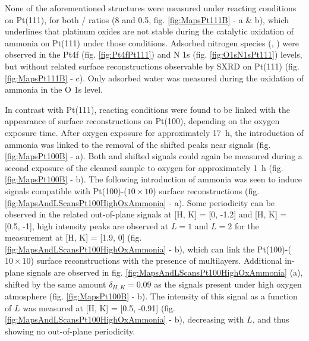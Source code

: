 None of the aforementioned structures were measured under reacting conditions on Pt(111), for both / ratios (\num{8} and \num{0.5}, fig. \ref{fig:MapsPt111B} - a \& b), which underlines that platinum oxides are not stable during the catalytic oxidation of ammonia on Pt(111) under those conditions.
Adsorbed nitrogen species (, ) were observed in the Pt4f (fig. \ref{fig:Pt4fPt111}) and N 1s (fig. \ref{fig:O1sN1sPt111}) levels, but without related surface reconstructions observable by SXRD on Pt(111) (fig. \ref{fig:MapsPt111B} - c).
Only adsorbed water was measured during the oxidation of ammonia in the O 1s level.

In contrast with Pt(111), reacting conditions were found to be linked with the appearance of surface reconstructions on Pt(100), depending on the oxygen exposure time.
After oxygen exposure for approximately \qty{17}{\hour}, the introduction of ammonia was linked to the removal of the shifted peaks near  signals (fig. \ref{fig:MapsPt100B} - a).
Both  and shifted signals could again be measured during a second exposure of the cleaned sample to oxygen for approximately \qty{1}{\hour} (fig. \ref{fig:MapsPt100B} - b).
The following introduction of ammonia was seen to induce signals compatible with Pt(100)-($10\times10$) surface reconstructions (fig. \ref{fig:MapsAndLScansPt100HighOxAmmonia} - a).
Some periodicity can be observed in the related out-of-plane signals at [H, K] = [0, -1.2] and [H, K] = [0.5, -1], high intensity peaks are observed at $L=1$ and $L=2$ for the measurement at [H, K] = [1.9, 0] (fig. \ref{fig:MapsAndLScansPt100HighOxAmmonia} - b), which can link the Pt(100)-($10\times10$) surface reconstructions with the presence of multilayers.
Additional in-plane signals are observed in fig. \ref{fig:MapsAndLScansPt100HighOxAmmonia} (a), shifted by the same amount $\delta_{H, K}=0.09$ as the signals present under high oxygen atmosphere (fig. \ref{fig:MapsPt100B} - b).
The intensity of this signal as a function of $L$ was measured at [H, K] = [0.5, -0.91] (fig. \ref{fig:MapsAndLScansPt100HighOxAmmonia} - b), decreasing with $L$, and thus showing no out-of-plane periodicity.


